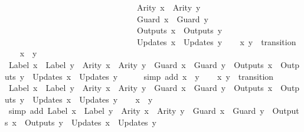 \begin{isabellebody}
\ \ \ \ \ \ \ \ \ \ \ \ \ \ \ \ \ \ \ \ \ \ \ \ \ \ \ \ \ \ \ \ {\isacharparenleft}Arity\ x{\isacharparenright}\ {\isacharequal}\ {\isacharparenleft}Arity\ y{\isacharparenright}\ {\isasymand}\isanewline
\ \ \ \ \ \ \ \ \ \ \ \ \ \ \ \ \ \ \ \ \ \ \ \ \ \ \ \ \ \ \ \ {\isacharparenleft}Guard\ x{\isacharparenright}\ {\isacharequal}\ {\isacharparenleft}Guard\ y{\isacharparenright}\ {\isasymand}\isanewline
\ \ \ \ \ \ \ \ \ \ \ \ \ \ \ \ \ \ \ \ \ \ \ \ \ \ \ \ \ \ \ \ {\isacharparenleft}Outputs\ x{\isacharparenright}\ {\isacharequal}\ {\isacharparenleft}Outputs\ y{\isacharparenright}\ {\isasymand}\isanewline
\ \ \ \ \ \ \ \ \ \ \ \ \ \ \ \ \ \ \ \ \ \ \ \ \ \ \ \ \ \ \ \ {\isacharparenleft}Updates\ x{\isacharparenright}\ {\isacharequal}\ {\isacharparenleft}Updates\ y{\isacharparenright}{\isacharparenright}{\isachardoublequoteclose}\isanewline
%
\isadelimproof
%
\endisadelimproof
%
\isatagproof
{}\isamarkupfalse%
\isanewline
\ \ \isamarkupfalse%
\ x\ y\ {\isacharcolon}{\isacharcolon}\ transition\isanewline
\ \ \isamarkupfalse%
\ {\isachardoublequoteopen}x\ {\isacharequal}\ y{\isachardoublequoteclose}\isanewline
\ \ \isamarkupfalse%
\ {\isachardoublequoteopen}Label\ x\ {\isacharequal}\ Label\ y\ {\isasymand}\ Arity\ x\ {\isacharequal}\ Arity\ y\ {\isasymand}\ Guard\ x\ {\isacharequal}\ Guard\ y\ {\isasymand}\ Outputs\ x\ {\isacharequal}\ Outputs\ y\ {\isasymand}\ Updates\ x\ {\isacharequal}\ Updates\ y{\isachardoublequoteclose}\isanewline
\ \ \ \ \isamarkupfalse%
\ {\isacharparenleft}simp\ add{\isacharcolon}\ {\isacartoucheopen}x\ {\isacharequal}\ y{\isacartoucheclose}{\isacharparenright}\isanewline
{}\isamarkupfalse%
\isanewline
\ \ \isamarkupfalse%
\ x\ y\ {\isacharcolon}{\isacharcolon}\ transition\isanewline
\ \ \isamarkupfalse%
\ {\isachardoublequoteopen}Label\ x\ {\isacharequal}\ Label\ y\ {\isasymand}\ Arity\ x\ {\isacharequal}\ Arity\ y\ {\isasymand}\ Guard\ x\ {\isacharequal}\ Guard\ y\ {\isasymand}\ Outputs\ x\ {\isacharequal}\ Outputs\ y\ {\isasymand}\ Updates\ x\ {\isacharequal}\ Updates\ y{\isachardoublequoteclose}\isanewline
\ \ \isamarkupfalse%
\ {\isachardoublequoteopen}x\ {\isacharequal}\ y{\isachardoublequoteclose}\isanewline
\ \ \ \ \isamarkupfalse%
\ {\isacharparenleft}simp\ add{\isacharcolon}\ {\isacartoucheopen}Label\ x\ {\isacharequal}\ Label\ y\ {\isasymand}\ Arity\ x\ {\isacharequal}\ Arity\ y\ {\isasymand}\ Guard\ x\ {\isacharequal}\ Guard\ y\ {\isasymand}\ Outputs\ x\ {\isacharequal}\ Outputs\ y\ {\isasymand}\ Updates\ x\ {\isacharequal}\ Updates\ y{\isacartoucheclose}{\isacharparenright}\isanewline

\end{isabellebody}
